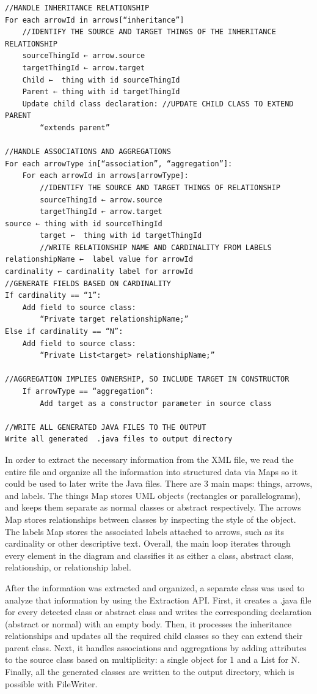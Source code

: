 \begin{verbatim}
//HANDLE INHERITANCE RELATIONSHIP
For each arrowId in arrows[“inheritance”]
	//IDENTIFY THE SOURCE AND TARGET THINGS OF THE INHERITANCE RELATIONSHIP
	sourceThingId ← arrow.source
	targetThingId ← arrow.target
	Child ←  thing with id sourceThingId
	Parent ← thing with id targetThingId
	Update child class declaration: //UPDATE CHILD CLASS TO EXTEND PARENT
		“extends parent”

//HANDLE ASSOCIATIONS AND AGGREGATIONS
For each arrowType in[“association”, “aggregation”]:
	For each arrowId in arrows[arrowType]:
		//IDENTIFY THE SOURCE AND TARGET THINGS OF RELATIONSHIP
		sourceThingId ← arrow.source
		targetThingId ← arrow.target
source ← thing with id sourceThingId
		target ←  thing with id targetThingId
		//WRITE RELATIONSHIP NAME AND CARDINALITY FROM LABELS 
relationshipName ←  label value for arrowId
cardinality ← cardinality label for arrowId
//GENERATE FIELDS BASED ON CARDINALITY
If cardinality == “1”:
	Add field to source class:
		“Private target relationshipName;”
Else if cardinality == “N”:
	Add field to source class:
		“Private List<target> relationshipName;”

//AGGREGATION IMPLIES OWNERSHIP, SO INCLUDE TARGET IN CONSTRUCTOR
	If arrowType == “aggregation”:
		Add target as a constructor parameter in source class

//WRITE ALL GENERATED JAVA FILES TO THE OUTPUT
Write all generated  .java files to output directory
\end{verbatim}

In order to extract the necessary information from the XML file, we read the entire file and organize all the information into structured data via Maps so it could be used to later write the Java files. There are 3 main maps: things, arrows, and labels. The things Map stores UML objects (rectangles or parallelograms), and keeps them separate as normal classes or abstract respectively. The arrows Map stores relationships between classes by inspecting the style of the object. The labels Map stores the associated labels attached to arrows, such as its cardinality or other descriptive text. Overall, the main loop iterates through every element in the diagram and classifies it as either a class, abstract class, relationship, or relationship label. 

After the information was extracted and organized, a separate class was used to analyze that information by using the Extraction API. First, it creates a .java file for every detected class or abstract class and writes the corresponding declaration (abstract or normal) with an empty body. Then, it processes the inheritance relationships and updates all the required child classes so they can extend their parent class. Next, it handles associations and aggregations by adding attributes to the source class based on multiplicity: a single object for 1 and a List for N. Finally, all the generated classes are written to the output directory, which is possible with FileWriter.

